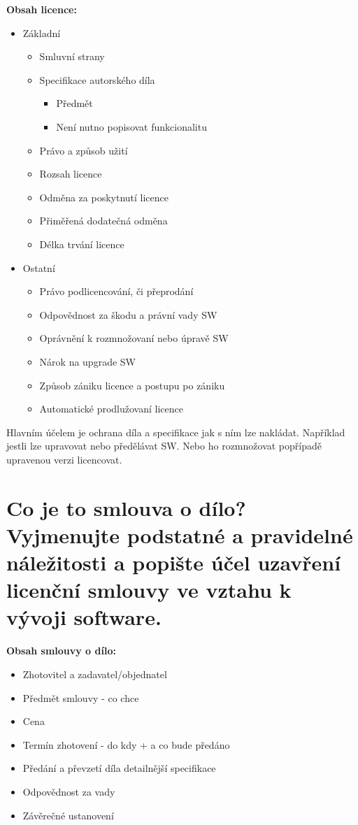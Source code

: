 \documentclass[12pt,a4paper,czech]{article}
\newcommand{\nadpis}[1]{{\section{#1}}}
\begin{document}
\noindent\textbf{Obsah licence:}
\begin{itemize}
    \item Základní
    \begin{itemize}
        \item Smluvní strany
        \item Specifikace autorského díla
        \begin{itemize}
            \item Předmět
            \item Není nutno popisovat funkcionalitu
        \end{itemize}
        \item Právo a způsob užití
        \item Rozsah licence
        \item Odměna za poskytnutí licence
        \item Přiměřená dodatečná odměna
        \item Délka trvání licence
    \end{itemize}
    \item Ostatní
    \begin{itemize}
        \item Právo podlicencování, či přeprodání
        \item Odpovědnost za škodu a právní vady SW
        \item Oprávnění k rozmnožovaní nebo úpravě SW
        \item Nárok na upgrade SW
        \item Způsob zániku licence a postupu po zániku
        \item Automatické prodlužovaní licence
    \end{itemize}
\end{itemize}
  
Hlavním účelem je ochrana díla a specifikace jak s ním lze nakládat. Například jestli lze upravovat nebo předělávat SW. Nebo ho rozmnožovat popřípadě upravenou verzi licencovat. 


\vspace{0.5cm} 
\nadpis{Co je to smlouva o dílo? Vyjmenujte podstatné a pravidelné náležitosti a popište účel uzavření licenční smlouvy ve vztahu k vývoji software.}

\noindent\textbf{Obsah smlouvy o dílo:}
\begin{itemize}
    \setlength\itemsep{0em}
    \item Zhotovitel a zadavatel/objednatel
    \item Předmět smlouvy - co chce
    \item Cena
    \item Termín zhotovení - do kdy + a co bude předáno
    \item Předání a převzetí díla detailnější specifikace
    \item Odpovědnost za vady
    \item Závěrečné ustanovení
\end{itemize}
\end{document}
